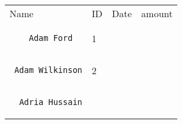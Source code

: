 \documentclass[]{article}
\author{}
\date{}
\begin{document}
\begin{longtable}[c]{@{}llll@{}}
\hline\noalign{\medskip}
\begin{minipage}[b]{0.39\columnwidth}\raggedright
Name
\end{minipage} & \begin{minipage}[b]{0.10\columnwidth}\raggedright
ID
\end{minipage} & \begin{minipage}[b]{0.13\columnwidth}\raggedright
Date
\end{minipage} & \begin{minipage}[b]{0.15\columnwidth}\raggedright
amount
\end{minipage}
\\\noalign{\medskip}
\hline\noalign{\medskip}
\begin{minipage}[t]{0.39\columnwidth}\raggedright
\begin{verbatim}
    Adam Ford
\end{verbatim}
\end{minipage} & \begin{minipage}[t]{0.10\columnwidth}\raggedright
1
\end{minipage} & \begin{minipage}[t]{0.13\columnwidth}\raggedright
\end{minipage} & \begin{minipage}[t]{0.15\columnwidth}\raggedright
\end{minipage}
\\\noalign{\medskip}
\begin{minipage}[t]{0.39\columnwidth}\raggedright
\begin{verbatim}
 Adam Wilkinson
\end{verbatim}
\end{minipage} & \begin{minipage}[t]{0.10\columnwidth}\raggedright
2
\end{minipage} & \begin{minipage}[t]{0.13\columnwidth}\raggedright
\end{minipage} & \begin{minipage}[t]{0.15\columnwidth}\raggedright
\end{minipage}
\\\noalign{\medskip}
\begin{minipage}[t]{0.39\columnwidth}\raggedright
\begin{verbatim}
  Adria Hussain
\end{verbatim}
\end{minipage} & \begin{minipage}[t]{0.10\columnwidth}\raggedright

\end{minipage}
\end{longtable}
\end{document}
